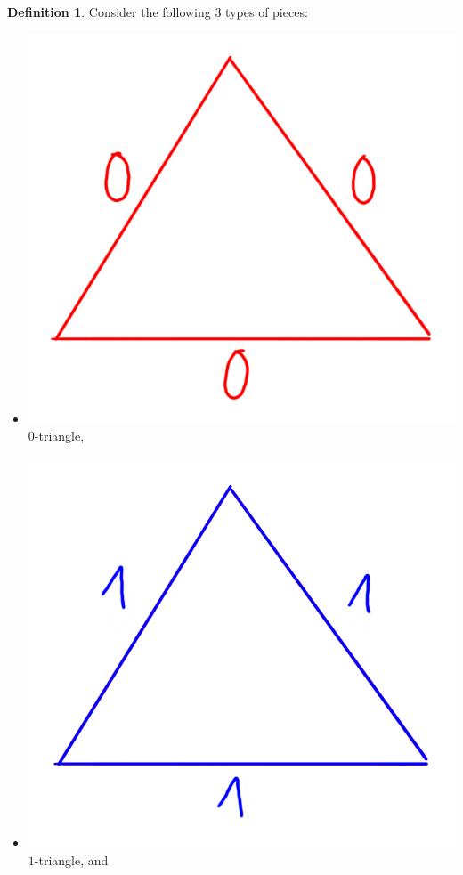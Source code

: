 \documentclass[12pt,a4paper]{amsart}
\theoremstyle{plain}
\theoremstyle{definition}
\newtheorem{defn}[thm]{Definition}
\theoremstyle{remark}
\begin{document}
\begin{defn}
  Consider the following $3$ types of pieces:
  \begin{itemize}
    \item \includegraphics[scale=.2]{pictures/triangle0} $0$-triangle,
    \item \includegraphics[scale=.2]{pictures/triangle1} $1$-triangle, and

\end{itemize}
\end{defn}
\end{document}
